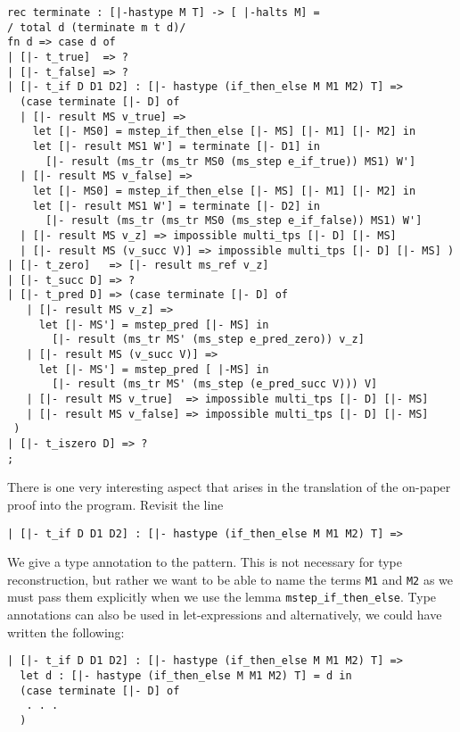 \begin{lstlisting}
rec terminate : [|-hastype M T] -> [ |-halts M] =
/ total d (terminate m t d)/
fn d => case d of
| [|- t_true]  => ?
| [|- t_false] => ?
| [|- t_if D D1 D2] : [|- hastype (if_then_else M M1 M2) T] =>
  (case terminate [|- D] of
  | [|- result MS v_true] =>
    let [|- MS0] = mstep_if_then_else [|- MS] [|- M1] [|- M2] in
    let [|- result MS1 W'] = terminate [|- D1] in
      [|- result (ms_tr (ms_tr MS0 (ms_step e_if_true)) MS1) W']
  | [|- result MS v_false] =>
    let [|- MS0] = mstep_if_then_else [|- MS] [|- M1] [|- M2] in
    let [|- result MS1 W'] = terminate [|- D2] in
      [|- result (ms_tr (ms_tr MS0 (ms_step e_if_false)) MS1) W']
  | [|- result MS v_z] => impossible multi_tps [|- D] [|- MS]
  | [|- result MS (v_succ V)] => impossible multi_tps [|- D] [|- MS] )
| [|- t_zero]   => [|- result ms_ref v_z]
| [|- t_succ D] => ?
| [|- t_pred D] => (case terminate [|- D] of
   | [|- result MS v_z] =>
     let [|- MS'] = mstep_pred [|- MS] in
       [|- result (ms_tr MS' (ms_step e_pred_zero)) v_z]
   | [|- result MS (v_succ V)] =>
     let [|- MS'] = mstep_pred [ |-MS] in
       [|- result (ms_tr MS' (ms_step (e_pred_succ V))) V]
   | [|- result MS v_true]  => impossible multi_tps [|- D] [|- MS]
   | [|- result MS v_false] => impossible multi_tps [|- D] [|- MS]
 )
| [|- t_iszero D] => ?
;
\end{lstlisting}

There is one very interesting aspect that arises in the
translation of the on-paper proof into the program. Revisit the line

\begin{center}
	\lstinline!| [|- t_if D D1 D2] : [|- hastype (if_then_else M M1 M2) T] =>!
\end{center}

We give a type annotation to the pattern. This is not necessary for
type reconstruction, but rather we want to be able to name the terms
\lstinline!M1! and \lstinline!M2! as we must pass them explicitly
when we use the lemma \lstinline!mstep_if_then_else!. Type annotations
can also be used in let-expressions and alternatively, we could have
written the following:

\begin{lstlisting}
| [|- t_if D D1 D2] : [|- hastype (if_then_else M M1 M2) T] =>
  let d : [|- hastype (if_then_else M M1 M2) T] = d in
  (case terminate [|- D] of
   . . .
  )
\end{lstlisting}


